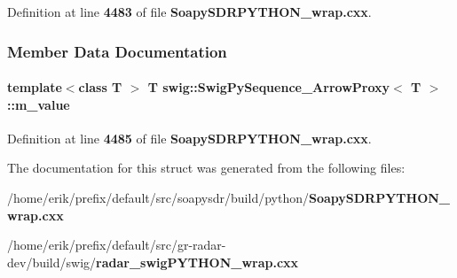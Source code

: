 Definition at line {\bf 4483} of file {\bf Soapy\+S\+D\+R\+P\+Y\+T\+H\+O\+N\+\_\+wrap.\+cxx}.



\subsubsection{Member Data Documentation}
\paragraph[{m\+\_\+value}]{\setlength{\rightskip}{0pt plus 5cm}template$<$class T $>$ T {\bf swig\+::\+Swig\+Py\+Sequence\+\_\+\+Arrow\+Proxy}$<$ T $>$\+::m\+\_\+value}\label{structswig_1_1SwigPySequence__ArrowProxy_a7e68416553925e7556e737325c324e0f}


Definition at line {\bf 4485} of file {\bf Soapy\+S\+D\+R\+P\+Y\+T\+H\+O\+N\+\_\+wrap.\+cxx}.



The documentation for this struct was generated from the following files\+:\begin{DoxyCompactItemize}
\item 
/home/erik/prefix/default/src/soapysdr/build/python/{\bf Soapy\+S\+D\+R\+P\+Y\+T\+H\+O\+N\+\_\+wrap.\+cxx}\item 
/home/erik/prefix/default/src/gr-\/radar-\/dev/build/swig/{\bf radar\+\_\+swig\+P\+Y\+T\+H\+O\+N\+\_\+wrap.\+cxx}\end{DoxyCompactItemize}
